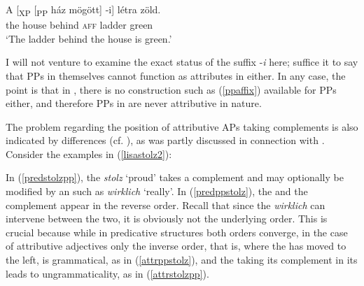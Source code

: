 \ea \gll	A	[\textsubscript{XP} [\textsubscript{PP}	ház	mögött]	-i]	létra	zöld. \label{ppaffix}\\
the	{} {} house	behind	\textsc{aff}	ladder	green\\
\glt `The ladder behind the house is green.'
\z

I will not venture to examine the exact status of the suffix -\textit{i} here; suffice it to say that PPs in themselves cannot function as attributes in  either. In any case, the point is that in , there is no construction such as (\ref{ppaffix}) available for PPs either, and therefore PPs in  are never attributive in nature.

The problem regarding the position of attributive APs taking  complements is also indicated by   differences (cf. \citealt[202]{haider1985}), as was partly discussed in connection with \citet{lechner1999diss, lechner2004}. Consider the examples in (\ref{lisastolz2}):

\ea \label{lisastolz2}
\z
\z

In (\ref{predstolzpp}), the  \textit{stolz} `proud' takes a  complement and may optionally be modified by an  such as \textit{wirklich} `really'. In (\ref{predppstolz}), the  and the  complement appear in the reverse order. Recall that since the  \textit{wirklich} can intervene between the two, it is obviously not the underlying order. This is crucial because while in predicative structures both orders converge, in the case of attributive adjectives only the inverse order, that is, where the  has moved to the left, is grammatical, as in (\ref{attrppstolz}), and the  taking its  complement in its  leads to ungrammaticality, as in (\ref{attrstolzpp}).

